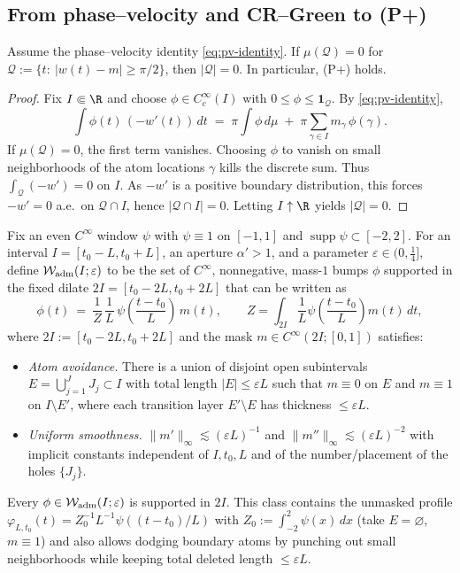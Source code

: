 \subsection*{From phase--velocity and CR--Green to (P+)}
\begin{lemma}\label{lem:mu-to-lebesgue}
Assume the phase--velocity identity \eqref{eq:pv-identity}.
If \(\mu(\mathcal Q)=0\) for \(\mathcal Q:=\{t:\ |w(t)-m|\ge \pi/2\}\), then \(|\mathcal Q|=0\).
In particular, \textup{(P+)} holds.
\end{lemma}
\begin{proof}
Fix \(I\Subset\R\) and choose \(\phi\in C_c^\infty(I)\) with \(0\le\phi\le\mathbf 1_{\mathcal Q}\).
By \eqref{eq:pv-identity},
\[
  \int \phi(t)\,(-w'(t))\,dt \;=\; \pi\!\int\phi\,d\mu \;+\; \pi\!\sum_{\gamma\in I} m_\gamma\,\phi(\gamma).
\]
If \(\mu(\mathcal Q)=0\), the first term vanishes.
Choosing \(\phi\) to vanish on small neighborhoods of the atom locations \(\gamma\) kills the discrete sum.
Thus \(\int_{\mathcal Q}(-w')=0\) on \(I\).
As \(-w'\) is a positive boundary distribution, this forces \(-w'=0\) a.e.\ on \(\mathcal Q\cap I\), hence \(|\mathcal Q\cap I|=0\).
Letting \(I\uparrow\R\) yields \(|\mathcal Q|=0\).
\end{proof}

\begin{definition}\label{def:adm-bumps}
Fix an even \(C^\infty\) window \(\psi\) with \(\psi\equiv1\) on \([-1,1]\) and \(\operatorname{supp}\psi\subset[-2,2]\).
For an interval \(I=[t_0-L,t_0+L]\), an aperture \(\alpha'>1\), and a parameter \(\varepsilon\in(0,\tfrac14]\), define \(\mathcal W_{\rm adm}(I;\varepsilon)\) to be the set of \(C^\infty\), nonnegative, mass-\(1\) bumps \(\phi\) supported in the fixed dilate \(2I=[t_0-2L,t_0+2L]\) that can be written as
\[
  \phi(t)\ =\ \frac{1}{Z}\,\frac{1}{L}\,\psi\!\left(\frac{t-t_0}{L}\right)\,m(t),
  \qquad Z=\int_{2I} \frac1L\psi\!\left(\frac{t-t_0}{L}\right)m(t)\,dt,
\]
where \(2I:=[t_0-2L,t_0+2L]\) and the mask \(m\in C^\infty(2I;[0,1])\) satisfies:
\begin{itemize}
\item[(i)] \emph{Atom avoidance.} There is a union of disjoint open subintervals \(E=\bigcup_{j=1}^{J} J_j\subset I\) with total length \(|E|\le \varepsilon L\) such that \(m\equiv0\) on \(E\) and \(m\equiv1\) on \(I\setminus E'\), where each transition layer \(E'\setminus E\) has thickness \(\le \varepsilon L\).
\item[(ii)] \emph{Uniform smoothness.} \(\|m'\|_\infty\lesssim (\varepsilon L)^{-1}\) and \(\|m''\|_\infty\lesssim (\varepsilon L)^{-2}\) with implicit constants independent of \(I,t_0,L\) and of the number/placement of the holes \(\{J_j\}\).
\end{itemize}
Every \(\phi\in\mathcal W_{\rm adm}(I;\varepsilon)\) is supported in \(2I\).
This class contains the unmasked profile \(\varphi_{L,t_0}(t)=Z_0^{-1}L^{-1}\psi((t-t_0)/L)\) with \(Z_0:=\int_{-2}^{2}\psi(x)\,dx\) (take \(E=\varnothing\), \(m\equiv1\)) and also allows dodging boundary atoms by punching out small neighborhoods while keeping total deleted length \(\le\varepsilon L\).
\end{definition}


